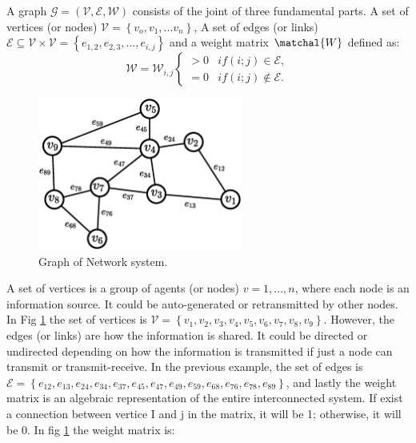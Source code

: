 A graph $\mathcal{G} = (\mathcal{V,E,W})$ consists of the joint of three fundamental parts. A set of vertices (or nodes) $\mathcal{V} = \left\{ v_o,v_1, ... v_n \right\}$, A set of edges (or links) $\mathcal{E} \subseteq  \mathcal{V} \times  \mathcal{V} =  \left \{ e_{1,2},e_{2,3},...,e_{i,j} \right \}$ and a weight matrix $\matchal{W}$ defined as:\\

\begin{equation}
\mathcal{W}  = \mathcal{W}_{i,j} \left\{ \begin{array}{cl}
> 0 & if (i;j) \in \mathcal{E}, \\
=0 & if (i;j) \notin  \mathcal{E}.
\end{array} \right.
\end{equation}


\begin{figure}[h]
\begin{center}
    \includegraphics[width=0.6\textwidth]{Kap2/Graph-01.eps}
    \caption{ Graph of Network system.}
    \label{fig:Graph}
\end{center}
\end{figure}


A set of vertices is a group of agents (or nodes) $v = 1,..., n$, where each node is an information source. It could be auto-generated or retransmitted by other nodes. In Fig \ref{fig:Graph} the set of vertices is $\mathcal{V} = \left\{ v_1,v_2,v_3,v_4,v_5,v_6,v_7,v_8,v_9 \right\}$.
However, the edges (or links) are how the information is shared. It could be directed or undirected depending on how the information is transmitted if just a node can transmit or transmit-receive. In the previous example, the set of edges is $ \mathcal{E} = \left\{ e_{12},e_{13},e_{24},e_{34},e_{37},e_{45},e_{47},e_{49},e_{59},e_{68},e_{76},e_{78},e_{89} \right\}$, and lastly the weight matrix is an algebraic representation of the entire interconnected system. If exist a connection between vertice I and j in the matrix, it will be 1; otherwise, it will be 0. In fig \ref{fig:Graph} the weight matrix is:


